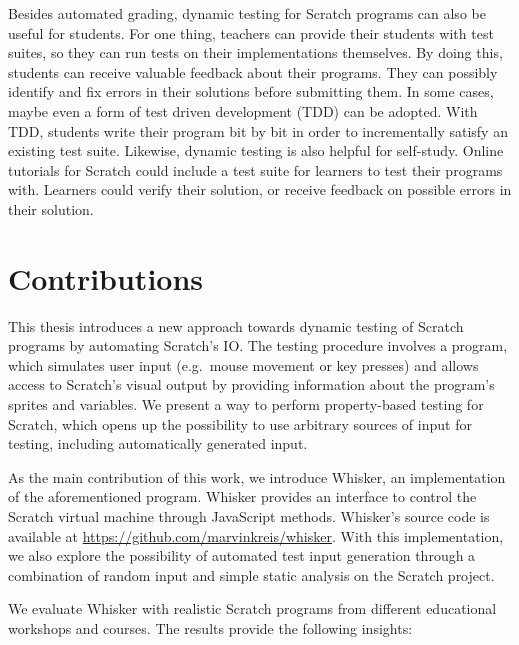 Besides automated grading, dynamic testing for Scratch programs can also be useful for students.
For one thing, teachers can provide their students with test suites, so they can run tests on their implementations themselves.
By doing this, students can receive valuable feedback about their programs.
They can possibly identify and fix errors in their solutions before submitting them.
In some cases, maybe even a form of test driven development (TDD) can be adopted.
With TDD, students write their program bit by bit in order to incrementally satisfy an existing test suite.
Likewise, dynamic testing is also helpful for self-study.
Online tutorials for Scratch could include a test suite for learners to test their programs with.
Learners could verify their solution, or receive feedback on possible errors in their solution.

\section{Contributions}

This thesis introduces a new approach towards dynamic testing of Scratch programs by automating Scratch's IO.
The testing procedure involves a program, which simulates user input (e.g.\ mouse movement or key presses)
and allows access to Scratch's visual output by providing information about the program's sprites and variables.
We present a way to perform property-based testing \cite{quickcheck} for Scratch,
which opens up the possibility to use arbitrary sources of input for testing,
including automatically generated input.
\parspace

As the main contribution of this work, we introduce Whisker, an implementation of the aforementioned program.
Whisker provides an interface to control the Scratch virtual machine through JavaScript methods.
Whisker's source code is available at \url{https://github.com/marvinkreis/whisker}.
With this implementation, we also explore the possibility of automated test input generation through a combination of random input and simple static analysis on the Scratch project.
\parspace

We evaluate Whisker with realistic Scratch programs from different educational workshops and courses.
The results provide the following insights:

